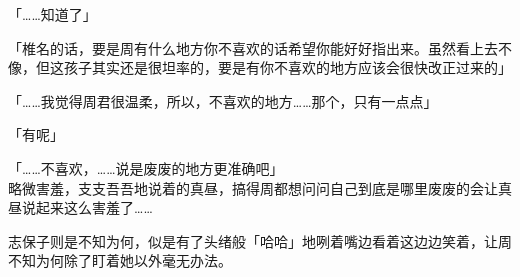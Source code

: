 「……知道了」

「椎名的话，要是周有什么地方你不喜欢的话希望你能好好指出来。虽然看上去不像，但这孩子其实还是很坦率的，要是有你不喜欢的地方应该会很快改正过来的」

「……我觉得周君很温柔，所以，不喜欢的地方……那个，只有一点点」

「有呢」

「……不喜欢，……说是废废的地方更准确吧」\\

略微害羞，支支吾吾地说着的真昼，搞得周都想问问自己到底是哪里废废的会让真昼说起来这么害羞了……

志保子则是不知为何，似是有了头绪般「哈哈」地咧着嘴边看着这边边笑着，让周不知为何除了盯着她以外毫无办法。

